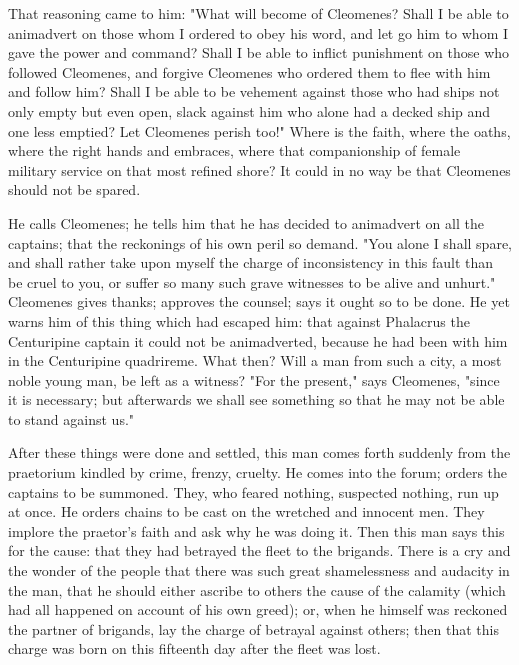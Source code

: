  That reasoning came to him: "What will become of Cleomenes? Shall I be able to animadvert on those whom I ordered to obey his word, and let go him to whom I gave the power and command? Shall I be able to inflict punishment on those who followed Cleomenes, and forgive Cleomenes who ordered them to flee with him and follow him? Shall I be able to be vehement against those who had ships not only empty but even open, slack against him who alone had a decked ship and one less emptied? Let Cleomenes perish too!" Where is the faith, where the oaths, where the right hands and embraces, where that companionship of female military service on that most refined shore? It could in no way be that Cleomenes should not be spared.

 He calls Cleomenes; he tells him that he has decided to animadvert on all the captains; that the reckonings of his own peril so demand. "You alone I shall spare, and shall rather take upon myself the charge of inconsistency in this fault than be cruel to you, or suffer so many such grave witnesses to be alive and unhurt." Cleomenes gives thanks; approves the counsel; says it ought so to be done. He yet warns him of this thing which had escaped him: that against Phalacrus the Centuripine captain it could not be animadverted, because he had been with him in the Centuripine quadrireme. What then? Will a man from such a city, a most noble young man, be left as a witness? "For the present," says Cleomenes, "since it is necessary; but afterwards we shall see something so that he may not be able to stand against us."

 After these things were done and settled, this man comes forth suddenly from the praetorium kindled by crime, frenzy, cruelty. He comes into the forum; orders the captains to be summoned. They, who feared nothing, suspected nothing, run up at once. He orders chains to be cast on the wretched and innocent men. They implore the praetor's faith and ask why he was doing it. Then this man says this for the cause: that they had betrayed the fleet to the brigands. There is a cry and the wonder of the people that there was such great shamelessness and audacity in the man, that he should either ascribe to others the cause of the calamity (which had all happened on account of his own greed); or, when he himself was reckoned the partner of brigands, lay the charge of betrayal against others; then that this charge was born on this fifteenth day after the fleet was lost.

